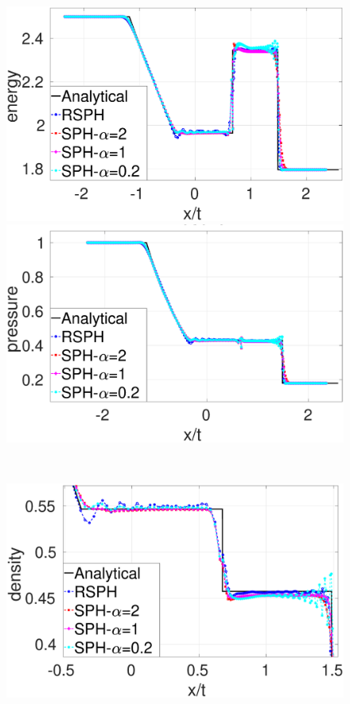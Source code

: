 \begin{figure}
\begin{minipage}{.495\textwidth}
        \includegraphics[width=0.99 \textwidth]{Chapter-4/Figures/Sod/RCM-Sod-SPH-alf-e}
    \end{minipage}%
    \begin{minipage}{.495 \textwidth}
        \centering
        \includegraphics[width=0.99 \textwidth]{Chapter-4/Figures/Sod/RCM-Sod-SPH-alf-p}
    \end{minipage}%
    \\
    \begin{minipage}{.495\textwidth}
        \centering
        \includegraphics[width=0.99 \textwidth]{Chapter-4/Figures/Sod/RCM-Sod-SPH-alf-rho-zoom}

\end{minipage}
\end{figure}
